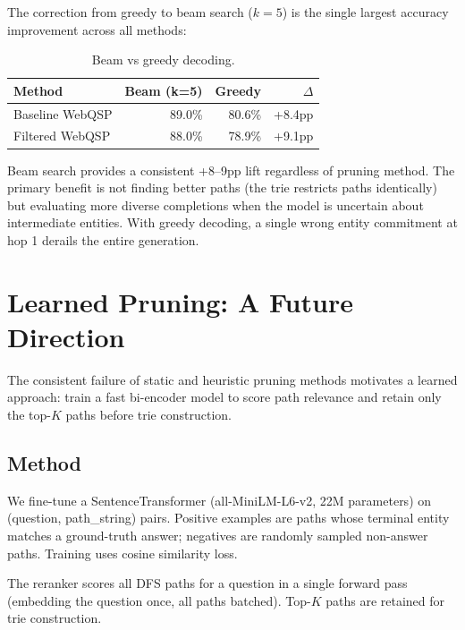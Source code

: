 \documentclass[11pt,twoside]{article}
\begin{document}
The correction from greedy to beam search (\(k=5\)) is the single largest
accuracy improvement across all methods:

\begin{table}[H]
  \centering
  \caption{Beam vs greedy decoding.}
  \label{tab:beam-vs-greedy}
  \begin{tabular}{lrrr}
    \toprule
    \textbf{Method} & \textbf{Beam (k=5)} & \textbf{Greedy} & \(\Delta\) \\
    \midrule
    Baseline WebQSP & 89.0\% & 80.6\% & +8.4pp \\
    Filtered WebQSP & 88.0\% & 78.9\% & +9.1pp \\
    \bottomrule
  \end{tabular}
\end{table}

Beam search provides a consistent +8--9pp lift regardless of pruning method.
The primary benefit is not finding better paths (the trie restricts paths
identically) but evaluating more diverse completions when the model is uncertain
about intermediate entities. With greedy decoding, a single wrong entity
commitment at hop 1 derails the entire generation.

\section{Learned Pruning: A Future Direction}
\label{sec:learned-pruning}

The consistent failure of static and heuristic pruning methods motivates a
learned approach: train a fast bi-encoder model to score path relevance and
retain only the top-\(K\) paths before trie construction.

\subsection{Method}

We fine-tune a SentenceTransformer (all-MiniLM-L6-v2, 22M parameters) on
(question, path\_string) pairs. Positive examples are paths whose terminal
entity matches a ground-truth answer; negatives are randomly sampled non-answer
paths. Training uses cosine similarity loss.

The reranker scores all DFS paths for a question in a single forward pass
(embedding the question once, all paths batched). Top-\(K\) paths are retained
for trie construction.
\end{document}
